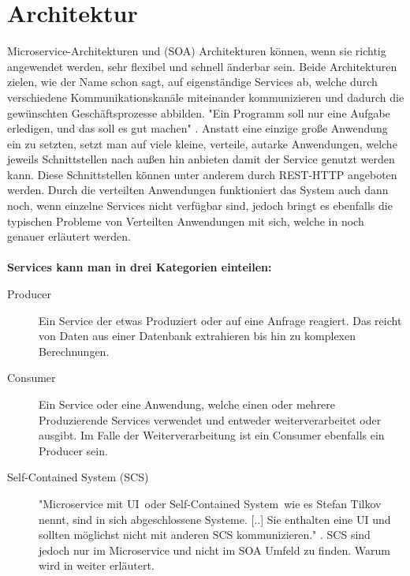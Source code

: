 \section{Architektur}
\label{sec:architektur}
Microservice-Architekturen und \SOA (SOA) Architekturen können, wenn sie richtig angewendet werden, sehr flexibel und schnell änderbar sein. Beide Architekturen zielen, wie der Name schon sagt, auf eigenständige Services ab, welche durch verschiedene Kommunikationskanäle miteinander kommunizieren und dadurch die gewünschten Geschäftsprozesse abbilden. "Ein Programm soll nur eine Aufgabe erledigen, und das soll es gut machen" \cite[S. 2]{EWolff2015:ContinuouosDelivery}. Anstatt eine einzige große Anwendung ein zu setzten, setzt man auf viele kleine, verteile, autarke Anwendungen, welche jeweils Schnittstellen nach außen hin anbieten damit der Service genutzt werden kann. Diese Schnittstellen können unter anderem durch REST-HTTP angeboten werden.
Durch die verteilten Anwendungen funktioniert das System auch dann noch, wenn einzelne Services nicht verfügbar sind, jedoch bringt es ebenfalls die typischen Probleme von Verteilten Anwendungen mit sich, welche in  noch genauer erläutert werden.
\\\\
\textbf{Services kann man in drei Kategorien einteilen:}
\begin{description}
    \item[Producer] Ein Service der etwas Produziert oder auf eine Anfrage reagiert. Das reicht von Daten aus einer Datenbank extrahieren bis hin zu komplexen Berechnungen.
    \item[Consumer] Ein Service oder eine Anwendung, welche einen oder mehrere Produzierende Services verwendet und entweder weiterverarbeitet oder ausgibt. Im Falle der Weiterverarbeitung ist ein Consumer ebenfalls ein Producer sein.
    \item[Self-Contained System (SCS)] "\frqq Microservice mit UI\flqq\ oder \frqq Self-Contained System\flqq\ wie es Stefan Tilkov nennt, sind in sich abgeschlossene Systeme. [..] Sie enthalten eine UI und sollten möglichst nicht mit anderen SCS kommunizieren." \cite[vgl S. 55]{EWolff2016:Microservices}. SCS sind jedoch nur im Microservice und nicht im SOA Umfeld zu finden. Warum wird in  weiter erläutert.
\end{description}


